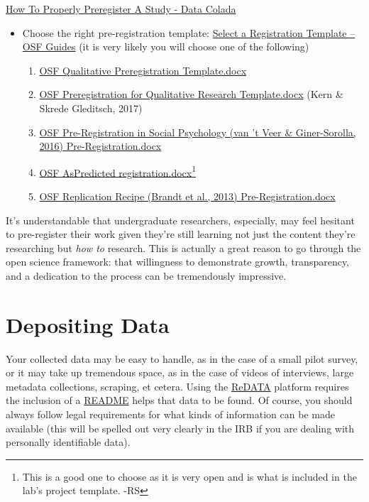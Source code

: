 \documentclass[]{tufte-book}
\providecommand{\tightlist}{%
  \setlength{\itemsep}{0pt}\setlength{\parskip}{0pt}}
\begin{document}
\href{http://datacolada.org/64}{How To Properly Preregister A Study - Data Colada}

\begin{itemize}
\tightlist
\item
  Choose the right pre-registration template: \href{https://help.osf.io/hc/en-us/articles/360019738794-Select-a-Registration-Template}{Select a Registration Template -- OSF Guides} (it is very likely you will choose one of the following)

  \begin{enumerate}
  \def\labelenumi{\arabic{enumi}.}
  \tightlist
  \item
    \href{https://osf.io/w4ac2/}{OSF \textbar{} Qualitative Preregistration Template.docx}
  \item
    \href{https://osf.io/b6xmd/}{OSF \textbar{} Preregistration for Qualitative Research Template.docx} (Kern \& Skrede Gleditsch, 2017)
  \item
    \href{https://osf.io/ce3hr/}{OSF \textbar{} Pre-Registration in Social Psychology (van 't Veer \& Giner-Sorolla, 2016) Pre-Registration.docx}
  \item
    \href{https://osf.io/fnsb6/}{OSF \textbar{} AsPredicted registration.docx}\footnote{This is a good one to choose as it is very open and is what is included in the lab's project template. -RS}
  \item
    \href{https://osf.io/4jd46/}{OSF \textbar{} Replication Recipe (Brandt et al., 2013) Pre-Registration.docx}
  \end{enumerate}
\end{itemize}

It's understandable that undergraduate researchers, especially, may feel hesitant to pre-register their work given they're still learning not just the content they're researching but \emph{how to} research. This is actually a great reason to go through the open science framework: that willingness to demonstrate growth, transparency, and a dedication to the process can be tremendously impressive.

\hypertarget{depositing-data}{%
\section{Depositing Data}\label{depositing-data}}

Your collected data may be easy to handle, as in the case of a small pilot survey, or it may take up tremendous space, as in the case of videos of interviews, large metadata collections, scraping, et cetera. Using the \protect\hyperlink{redata}{ReDATA} platform requires the inclusion of a \href{https://osf.io/sj8xv/}{README} helps that data to be found. Of course, you should always follow legal requirements for what kinds of information can be made available (this will be spelled out very clearly in the IRB if you are dealing with personally identifiable data).
\end{document}
